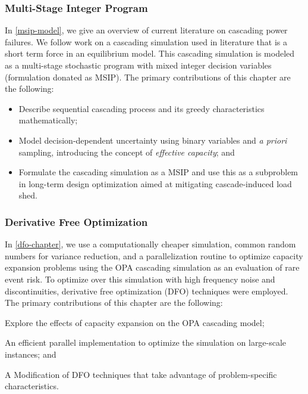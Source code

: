 \subsubsection{Multi-Stage Integer Program}
In \cref{msip-model}, we  give an overview of current literature on cascading power failures.  We follow work on a cascading simulation used in literature that is a short term force in an equilibrium model.  This cascading simulation is modeled as a multi-stage stochastic program with mixed integer decision variables (formulation donated as MSIP).  The primary contributions of this chapter are the following:
\begin{itemize}
\item Describe sequential cascading process and its greedy characteristics mathematically;
\item Model decision-dependent uncertainty using binary variables and {\it a priori} sampling, introducing the concept of {\it effective capacity}; and 
\item Formulate the cascading simulation as a MSIP and use this as a subproblem in long-term design optimization aimed at mitigating cascade-induced load shed.
\end{itemize}

\subsubsection{Derivative Free Optimization}
In \cref{dfo-chapter}, we use a computationally cheaper simulation, common random numbers for variance reduction, and a parallelization routine to optimize capacity expansion problems using the OPA cascading simulation as an evaluation of rare event risk.  To optimize over this simulation with high frequency noise and discontinuities, derivative free optimization (DFO) techniques were employed.  The primary contributions of this chapter are the following:
\bi
\item Explore the effects of capacity expansion on the OPA cascading model;
\item An efficient parallel implementation to optimize the simulation on large-scale instances; and
\item A Modification of DFO techniques that take advantage of problem-specific characteristics.
\ei

